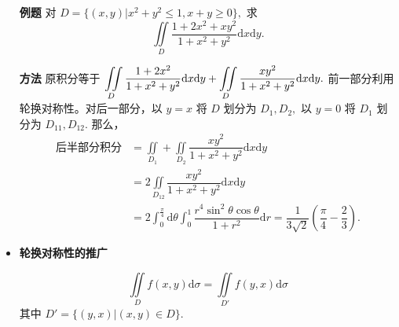 \begin{enumerate}
    \item[\textbf{例题}]
    对 $ D = \{(x,y)|x^2+y^2\leq 1, x+y\geq 0\}, $ 求
    $$
        \iint\limits_D\dfrac{1+2x^2+xy^2}{1+x^2+y^2}\mathrm{d}x\mathrm{d}y.
    $$
    \item[\textbf{方法}] 
    原积分等于 $ \displaystyle \iint\limits_D\dfrac{1+2x^2}{1+x^2+y^2}\mathrm{d}x\mathrm{d}y+
    \iint\limits_D\dfrac{xy^2}{1+x^2+y^2}\mathrm{d}x\mathrm{d}y. $ 
    前一部分利用轮换对称性。对后一部分，以 $ y = x $ 将 $ D $ 
    划分为 $ D_1,D_2, $ 以 $ y = 0 $ 将 $ D_1 $ 划分为 $ D_{11},D_{12}. $ 
    那么，
    \begin{equation*}
        \begin{aligned}
            \textrm{后半部分积分} &= \iint\limits_{D_1}+\iint\limits_{D_2}
            \dfrac{xy^2}{1+x^2+y^2}\mathrm{d}x\mathrm{d}y\\ 
            &= 2\iint\limits_{D_12}\dfrac{xy^2}{1+x^2+y^2}\mathrm{d}x\mathrm{d}y\\ 
            &= 2\int_{0}^\frac{\pi}{4}\mathrm{d}\theta\int_0^1
            \dfrac{r^4\sin^2\theta\cos\theta}{1+r^2}\mathrm{d}r = \dfrac{1}{3\sqrt 2}
            \left(\dfrac{\pi}{4}-\dfrac{2}{3}\right).
        \end{aligned}
    \end{equation*}
\end{enumerate}


\begin{itemize}
    \item \textbf{轮换对称性的推广}
    
    $$
        \iint\limits_Df(x,y)\mathrm{d}\sigma = 
        \iint\limits_{D'}f(y,x)\mathrm{d}\sigma
    $$
    其中 $ D' = \{(y,x)|(x,y)\in D\}. $ 
\end{itemize}